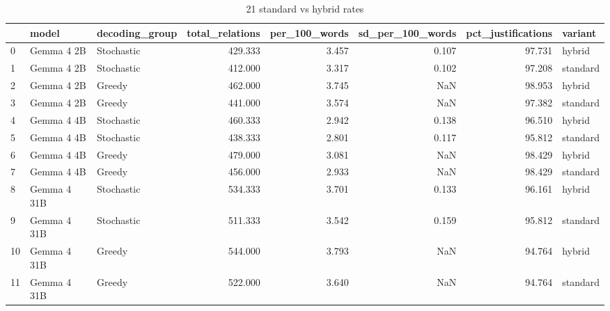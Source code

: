 \begin{table}
\caption{21 standard vs hybrid rates}
\begin{tabular}{lllrrrrl}
\toprule
 & model & decoding\_group & total\_relations & per\_100\_words & sd\_per\_100\_words & pct\_justifications & variant \\
\midrule
0 & Gemma 4 2B & Stochastic & 429.333 & 3.457 & 0.107 & 97.731 & hybrid \\
1 & Gemma 4 2B & Stochastic & 412.000 & 3.317 & 0.102 & 97.208 & standard \\
2 & Gemma 4 2B & Greedy & 462.000 & 3.745 & NaN & 98.953 & hybrid \\
3 & Gemma 4 2B & Greedy & 441.000 & 3.574 & NaN & 97.382 & standard \\
4 & Gemma 4 4B & Stochastic & 460.333 & 2.942 & 0.138 & 96.510 & hybrid \\
5 & Gemma 4 4B & Stochastic & 438.333 & 2.801 & 0.117 & 95.812 & standard \\
6 & Gemma 4 4B & Greedy & 479.000 & 3.081 & NaN & 98.429 & hybrid \\
7 & Gemma 4 4B & Greedy & 456.000 & 2.933 & NaN & 98.429 & standard \\
8 & Gemma 4 31B & Stochastic & 534.333 & 3.701 & 0.133 & 96.161 & hybrid \\
9 & Gemma 4 31B & Stochastic & 511.333 & 3.542 & 0.159 & 95.812 & standard \\
10 & Gemma 4 31B & Greedy & 544.000 & 3.793 & NaN & 94.764 & hybrid \\
11 & Gemma 4 31B & Greedy & 522.000 & 3.640 & NaN & 94.764 & standard \\
\bottomrule
\end{tabular}
\end{table}
